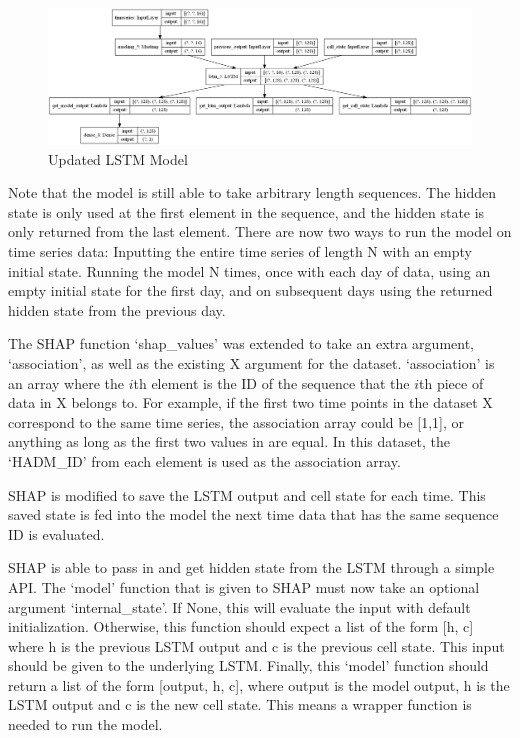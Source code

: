 \documentclass[12pt]{article}
\begin{document}
\begin{figure}[H]
\centering\caption{Updated LSTM Model}
\includegraphics[scale=0.25]{BIG model.png}
\end{figure}
Note that the model is still able to take arbitrary length sequences. The hidden state is only used at the first element in the sequence, and the hidden state is only returned from the last element. There are now two ways to run the model on time series data: Inputting the entire time series of length N with an empty initial state. Running the model N times, once with each day of data, using an empty initial state for the first day, and on subsequent days using the returned hidden state from the previous day.

The SHAP function `shap\_values' was extended to take an extra argument, `association', as well as the existing X argument for the dataset. `association' is an array where the $i$th element is the ID of the sequence that the $i$th piece of data in X belongs to. For example, if the first two time points in the dataset X correspond to the same time series, the association array could be [1,1], or anything as long as the first two values in are equal. In this dataset, the `HADM\_ID' from each element is used as the association array.

SHAP is modified to save the LSTM output and cell state for each time. This saved state is fed into the model the next time data that has the same sequence ID is evaluated. 

SHAP is able to pass in and get hidden state from the LSTM through a simple API. The `model' function that is given to SHAP must now take an optional argument `internal\_state'. If None, this will evaluate the input with default initialization. Otherwise, this function should expect a list of the form [h, c] where h is the previous LSTM output and c is the previous cell state. This input should be given to the underlying LSTM. Finally, this `model' function should return a list of the form [output, h, c], where output is the model output, h is the LSTM output and c is the new cell state. This means a wrapper function is needed to run the model. 
\end{document}
